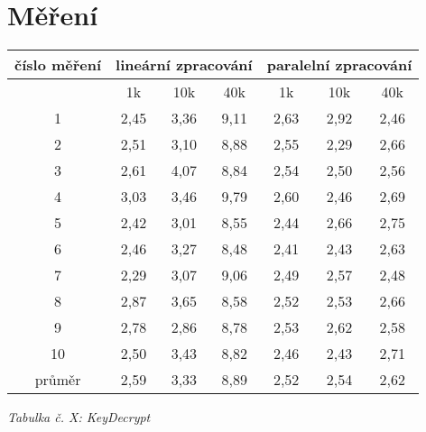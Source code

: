 \documentclass{article}
\begin{document}
\section{Měření}
\begin{center}
	\begin{tabular}{ c | c | c | c | c | c | c }
		\textbf{číslo měření} & \multicolumn{3}{c|}{\textbf{lineární zpracování}} & \multicolumn{3}{|c}{\textbf{paralelní zpracování}} \\
		\hline
		& 1k & 10k & 40k & 1k & 10k & 40k \\
		\hline
		1 & 2,45 & 3,36 & 9,11 & 2,63 & 2,92 & 2,46 \\
		\hline
		2 & 2,51 & 3,10 & 8,88 & 2,55 & 2,29 & 2,66 \\
		\hline
		3 & 2,61 & 4,07 & 8,84 & 2,54 & 2,50 & 2,56 \\
		\hline
		4 & 3,03 & 3,46 & 9,79 & 2,60 & 2,46 & 2,69 \\
		\hline
		5 & 2,42 & 3,01 & 8,55 & 2,44 & 2,66 & 2,75 \\
		\hline
		6 & 2,46 & 3,27 & 8,48 & 2,41 & 2,43 & 2,63 \\
		\hline
		7 & 2,29 & 3,07 & 9,06 & 2,49 & 2,57 & 2,48 \\
		\hline
		8 & 2,87 & 3,65 & 8,58 & 2,52 & 2,53 & 2,66 \\
		\hline
		9 & 2,78 & 2,86 & 8,78 & 2,53 & 2,62 & 2,58 \\
		\hline
		10 & 2,50 & 3,43 & 8,82 & 2,46 & 2,43 & 2,71 \\
		\hline
		průměr & 2,59 & 3,33 & 8,89 & 2,52 & 2,54 & 2,62 \\
	\end{tabular}
	\newline
	\textit{Tabulka č. X: KeyDecrypt}
\end{center}
\end{document}
